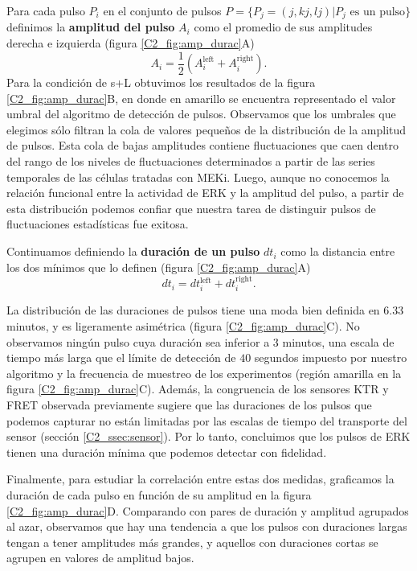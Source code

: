 \documentclass[./main.tex]{subfiles}
\begin{document}
 Para cada pulso $P_i$ en el conjunto de pulsos $P= \lbrace P_j=(j, kj, lj) | P_j \text{ es un pulso} \rbrace$ definimos la \textbf{amplitud del pulso} $A_i$ como el promedio de sus amplitudes derecha e izquierda (figura \ref{C2_fig:amp_durac}A) 
\begin{equation}
    A_i = \frac{1}{2} (A_i^{\text{left}} +  A_i^{\text{right}}).
\end{equation}
Para la condición de s+L obtuvimos los resultados de la figura \ref{C2_fig:amp_durac}B, en donde en  amarillo se encuentra representado el valor umbral del algoritmo de detección de pulsos. Observamos que los umbrales que elegimos sólo filtran la cola de valores pequeños de la distribución de la amplitud de pulsos. Esta cola de bajas amplitudes contiene fluctuaciones que caen dentro del rango de los niveles de fluctuaciones determinados a partir de las series temporales de las células tratadas con MEKi. Luego, aunque no conocemos la relación funcional entre la actividad de ERK y la amplitud del pulso, a partir de esta distribución podemos confiar que nuestra tarea de distinguir pulsos de fluctuaciones estadísticas fue exitosa.


Continuamos definiendo la \textbf{duración de un pulso} $dt_i$ como la distancia entre los dos mínimos que lo definen (figura \ref{C2_fig:amp_durac}A) 
\begin{equation}
    dt_i = dt_i^{\text{left}} + dt_i^{\text{right}}.
    \label{C2_eq:duracion_de_pulsos}
\end{equation}


 La distribución de las duraciones de pulsos tiene una moda bien definida en $6.33$ minutos, y es ligeramente asimétrica (figura \ref{C2_fig:amp_durac}C). No observamos ningún pulso cuya duración sea inferior a $3$ minutos, una escala de tiempo más larga que el límite de detección de $40$ segundos impuesto por nuestro algoritmo y la frecuencia de muestreo de los experimentos (región amarilla en la figura \ref{C2_fig:amp_durac}C). Además, la congruencia de los sensores KTR y FRET observada previamente sugiere que las duraciones de los pulsos que podemos capturar no están limitadas por las escalas de tiempo del transporte del sensor (sección \ref{C2_ssec:sensor}). Por lo tanto, concluimos que los pulsos de ERK tienen una duración mínima que podemos detectar con fidelidad.

 
Finalmente, para estudiar la correlación entre estas dos medidas, graficamos la duración de cada pulso en función de su amplitud en la figura \ref{C2_fig:amp_durac}D. Comparando con pares de duración y amplitud agrupados al azar, observamos que hay una tendencia a que los pulsos con duraciones largas tengan a tener amplitudes más grandes, y aquellos con duraciones cortas se agrupen en valores de amplitud bajos. 
\end{document}
